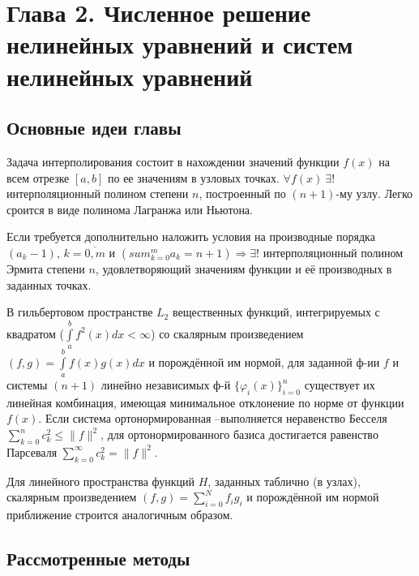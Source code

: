 \newpage
{}
\pagestyle{empty}
\vspace{0.5cm}

\section*{Глава 2. Численное решение нелинейных уравнений и систем нелинейных уравнений}

\subsection{Основные идеи главы} 

    Задача интерполирования состоит в нахождении значений функции $f(x)$
    на всем отрезке $[a,b]$ по ее значениям в узловых точках. $\forall f(x)~\exists!$ интерполяционный полином степени $n$, построенный по $(n+1)$-му узлу. Легко сроится в виде полинома Лагранжа или Ньютона.

Если требуется дополнительно наложить условия на производные порядка $(a_k-1)$, $k = \overline{0,m}$ и $(sum_{k=0}^m a_k = n + 1) \Rightarrow \exists!$ интерполяционный полином Эрмита степени $n$, удовлетворяющий значениям функции и её производных в заданных точках.

В гильбертовом пространстве $L_2$ вещественных функций, интегрируемых с квадратом ($\int\limits_a^b{f^2(x)dx} < \infty$) со скалярным произведением $(f,g)=\int\limits_a^b{f(x)g(x)dx}$ и порождённой им нормой, для заданной ф-ии $f$ и системы $(n+1)$ линейно независимых ф-й $\{\varphi_i(x)\}_{i=0}^n$ существует их линейная комбинация, имеющая минимальное отклонение по норме от функции $f(x)$. Если система ортонормированная –выполняется неравенство Бесселя $\sum_{k=0}^n c_k^2 \leqslant \|f\|^2$, для ортонормированного базиса достигается равенство Парсеваля $\sum_{k=0}^\infty c_k^2 = \|f\|^2.$

Для линейного пространства функций $H$, заданных таблично (в узлах),  скалярным произведением $(f,g) = \sum\limits_{i=0}^N f_i g_i$ и порождённой им нормой приближение строится аналогичным образом.

\subsection{Рассмотренные методы}